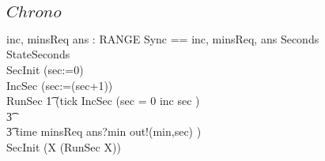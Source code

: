 \subsection{$Chrono$}
\begin{circus}
\circchannel inc, minsReq
\also \circchannel ans : RANGE
\also \circchannelset Sync == \lchanset inc, minsReq, ans \rchanset
\also \circprocess Seconds \circdef\ \circbegin\\
\circstate StateSeconds \\
SecInit \circdef (sec:=0)\\
IncSec \circdef (sec:=(sec+1))\\
RunSec \circdef \t1
(tick \then IncSec \circseq
    (\circif  sec = 0 \circthen inc \then \Skip
    \circelse sec  \circthen \Skip \circfi)
  \\\t3 \extchoice\\
  \t3  time \then minsReq \then ans?min \then out!(min,sec)
      \then \Skip )  \\
 \circspot SecInit \circseq (\circmu X \circspot (RunSec \circseq X))\\
\circend
\end{circus}
